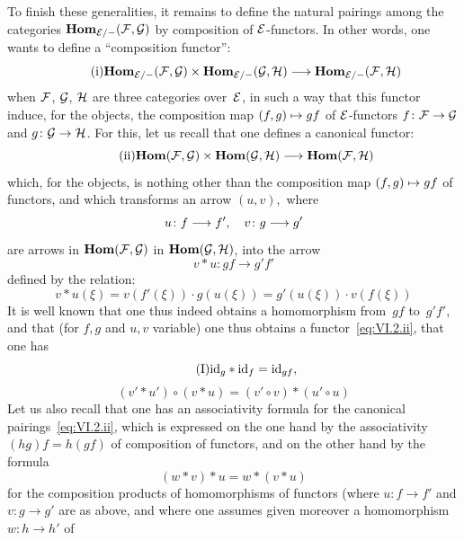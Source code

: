 To finish these generalities, it remains to define the
natural pairings among the categories
$\SheafHom_{\cal{E}/-}(\cal{F},\cal{G})$ by composition of
$\cal{E}$-functors. In other words, one wants to define a
``composition functor'':
\begin{equation*}
\tag{i}
\label{eq:VI.2.i} {\SheafHom_{\cal{E}/-}(\cal{F},\cal{G})\times
\SheafHom_{\cal{E}/-}(\cal{G},\cal{H})\to
\SheafHom_{\cal{E}/-}(\cal{F},\cal{H})}
\end{equation*}
when $\cal{F}$, $\cal{G}$, $\cal{H}$ are three categories
over~$\cal{E}$, in such a way that this functor induce, for the
objects, the composition map $(f,g)\mto gf$ of
$\cal{E}$-functors $f\colon\cal{F}\to\cal{G}$ and $g\colon \cal{G}\to
\cal{H}$. For this, let us recall that one defines a canonical
functor:
\begin{equation*}
\tag{ii}
\label{eq:VI.2.ii}
{\SheafHom(\cal{F},\cal{G})\times\SheafHom(\cal{G},\cal{H})\to
\SheafHom(\cal{F},\cal{H})}
\end{equation*}
which, for the objects, is nothing other than the composition map
$(f,g)\mto gf$ of functors, and which transforms an arrow
$(u,v)$,~where
$$
u\colon f\to f'\quoi,\quad v\colon g\to g'
$$
are arrows in $\SheafHom(\cal{F},\cal{G})$ \resp in
$\SheafHom(\cal{G},\cal{H})$, into the arrow
$$
v*u\colon gf\to g'f'
$$
defined by the relation:
$$
v*u(\xi)=v(f'(\xi))\cdot g(u(\xi))=g'(u(\xi))\cdot v(f(\xi))
$$
It is well known that one thus indeed obtains a homomorphism from~$gf$
to~$g'f'$, and that (for $f,g$ and $u,v$ variable) one thus obtains
a functor~\eqref{eq:VI.2.ii}, \ie that one has
\begin{equation*}
\tag{I}
\label{eq:VI.2.I} {\id_g*\id_f=\id_{gf}\quoi,}
\end{equation*}
\begin{equation*}
\tag{II}
\label{eq:VI.2.II} {(v'*u')\circ(v*u)=(v'\circ v)*(u'\circ u)}
\end{equation*}
Let us also recall that one has an associativity formula for the
canonical pairings~\eqref{eq:VI.2.ii}, which is expressed on the one hand
by the associativity $(hg)f=h(gf)$ of composition of functors,
and on the other hand by the formula
\begin{equation*}
\tag{III}
\label{eq:VI.2.III} {(w*v)*u=w*(v*u)}
\end{equation*}
for the composition products of homomorphisms of functors (where
$u\colon f\to f'$ and $v\colon g\to g'$ are as above, and where one
assumes given moreover a homomorphism $w\colon h\to h'$ of
